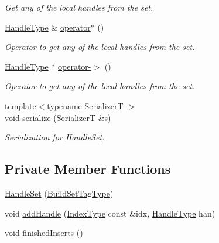\begin{DoxyCompactItemize}
\begin{DoxyCompactList}\small\item\em Get any of the local handles from the set. \end{DoxyCompactList}\item 
\hyperlink{structvt_1_1rdma_1_1_handle_set_ab3a698ee86bae503dfa84617205b2dd9}{Handle\+Type} \& \hyperlink{structvt_1_1rdma_1_1_handle_set_a9ad10a3906540909c0344bbf84789fba}{operator$\ast$} ()
\begin{DoxyCompactList}\small\item\em Operator to get any of the local handles from the set. \end{DoxyCompactList}\item 
\hyperlink{structvt_1_1rdma_1_1_handle_set_ab3a698ee86bae503dfa84617205b2dd9}{Handle\+Type} $\ast$ \hyperlink{structvt_1_1rdma_1_1_handle_set_a0f19b37d4a11e43a1ab68710b9d15404}{operator-\/$>$} ()
\begin{DoxyCompactList}\small\item\em Operator to get any of the local handles from the set. \end{DoxyCompactList}\item 
{\footnotesize template$<$typename SerializerT $>$ }\\void \hyperlink{structvt_1_1rdma_1_1_handle_set_a4a78a0c0e54d6044676c560c00fba248}{serialize} (SerializerT \&s)
\begin{DoxyCompactList}\small\item\em Serialization for {\ttfamily \hyperlink{structvt_1_1rdma_1_1_handle_set}{Handle\+Set}}. \end{DoxyCompactList}\end{DoxyCompactItemize}
\subsection*{Private Member Functions}
\begin{DoxyCompactItemize}
\item 
\hyperlink{structvt_1_1rdma_1_1_handle_set_aa6ee5e632ebe755859acc38c1fe6f064}{Handle\+Set} (\hyperlink{structvt_1_1rdma_1_1_handle_set_1_1_build_set_tag_type}{Build\+Set\+Tag\+Type})
\item 
void \hyperlink{structvt_1_1rdma_1_1_handle_set_a870d2596189da0477b434b268e1c2137}{add\+Handle} (\hyperlink{structvt_1_1rdma_1_1_handle_set_aa0dbb6a47c459fb4290f0ca96e573097}{Index\+Type} const \&idx, \hyperlink{structvt_1_1rdma_1_1_handle_set_ab3a698ee86bae503dfa84617205b2dd9}{Handle\+Type} han)
\item 
void \hyperlink{structvt_1_1rdma_1_1_handle_set_ad5b51f17e95368c892480eebc7d4aa76}{finished\+Inserts} ()
\end{DoxyCompactItemize}
